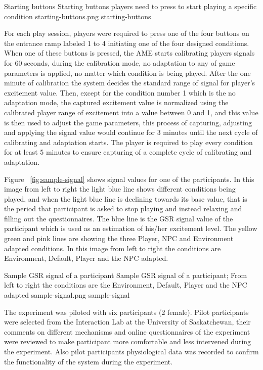 \largeimg
{Starting buttons}
{Starting buttons players need to press to start playing a specific condition}
{starting-buttons.png}
{starting-buttons}

For each play session, players were required to press one of the four buttons on the entrance ramp labeled 1 to 4 initiating one of the four designed conditions. When one of these buttons is pressed, the AME starts calibrating players signals for 60 seconds, during the calibration mode, no adaptation to any of game parameters is applied, no matter which condition is being played. After the one minute of calibration the system decides the standard range of signal for player's excitement value. Then, except for the condition number 1 which is the no adaptation mode, the captured excitement value is normalized using the calibrated player range of excitement into a value between 0 and 1, and this value is then used to adjust the game parameters, this process of capturing, adjusting and applying the signal value would continue for 3 minutes until the next cycle of calibrating and adaptation starts. The player is required to play every condition for at least 5 minutes to ensure capturing of a complete cycle of calibrating and adaptation.

Figure ~\ref{fig:sample-signal} shows signal values for one of the participants. In this image from left to right the light blue line shows different conditions being played, and when the light blue line is declining towards its base value, that is the period that participant is asked to stop playing and instead relaxing and filling out the questionnaires. The blue line is the GSR signal value of the participant which is used as an estimation of his/her excitement level. The yellow green and pink lines are showing the three Player, NPC and Environment adapted conditions. In this image from left to right the conditions are Environment, Default, Player and the NPC adapted.

\largeimg
{Sample GSR signal of a participant}
{Sample GSR signal of a participant; From left to right the conditions are the Environment, Default, Player and the NPC adapted}
{sample-signal.png}
{sample-signal}

The experiment was piloted with six participants (2 female). Pilot participants were selected from the Interaction Lab at the University of Saskatchewan, their comments on different mechanisms and online questionnaires of the experiment were reviewed to make participant more comfortable and less intervened during the experiment. Also pilot participants physiological data was recorded to confirm the functionality of the system during the experiment.

